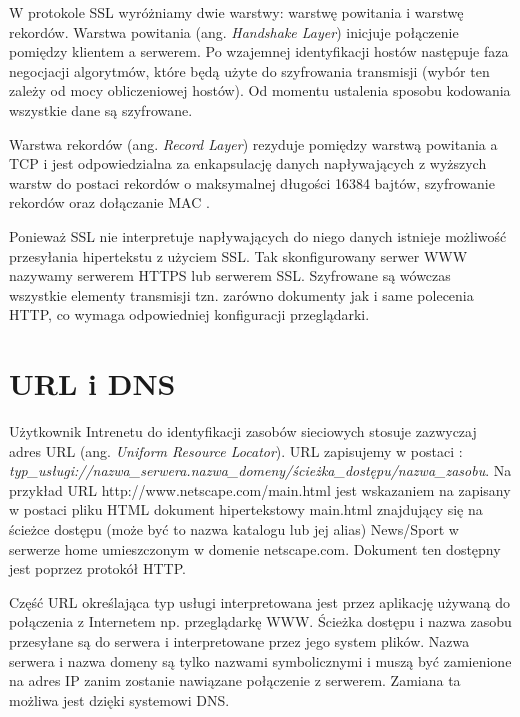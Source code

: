 W protokole SSL wyróżniamy dwie warstwy: warstwę powitania i warstwę rekordów. Warstwa powitania (ang. \emph{Handshake Layer}) 
inicjuje połączenie 
pomiędzy klientem a serwerem. Po wzajemnej identyfikacji hostów następuje faza negocjacji algorytmów, które będą 
użyte do szyfrowania transmisji (wybór ten zależy od mocy obliczeniowej hostów). Od momentu ustalenia sposobu 
kodowania wszystkie dane są szyfrowane.

Warstwa rekordów (ang. \emph{Record Layer}) rezyduje pomiędzy warstwą powitania a TCP i jest odpowiedzialna za 
enkapsulację danych napływających z wyższych warstw do postaci rekordów o maksymalnej długości 16384 bajtów, 
szyfrowanie rekordów oraz dołączanie MAC \cite{barylo10}.

Ponieważ SSL nie interpretuje napływających do niego danych istnieje możliwość przesyłania hipertekstu z 
użyciem SSL. Tak skonfigurowany serwer WWW nazywamy serwerem HTTPS lub serwerem SSL. Szyfrowane są wówczas 
wszystkie elementy  transmisji tzn. zarówno dokumenty jak i same polecenia HTTP, co wymaga odpowiedniej 
konfiguracji przeglądarki.

\section{URL i DNS}
	
Użytkownik Intrenetu do identyfikacji zasobów sieciowych stosuje zazwyczaj adres URL (ang. \emph{Uniform Resource 
Locator}). URL zapisujemy w postaci \cite{barylo5, barylo6}:\\
\emph{typ\_usługi://nazwa\_serwera.nazwa\_domeny/ścieżka\_dostępu/nazwa\_zasobu}. 
Na przykład URL http://www.netscape.com/main.html jest wskazaniem na zapisany w postaci pliku HTML 
dokument hipertekstowy main.html znajdujący się na ścieżce dostępu (może być to nazwa katalogu lub jej alias) 
News/Sport w serwerze home umieszczonym w domenie netscape.com. Dokument ten dostępny jest poprzez protokół 
HTTP.

Część URL określająca typ usługi interpretowana jest przez aplikację używaną do połączenia z Internetem 
np. przeglądarkę WWW. Ścieżka dostępu i nazwa zasobu przesyłane są do serwera i interpretowane przez jego system 
plików. Nazwa serwera i nazwa domeny są tylko nazwami symbolicznymi i muszą być zamienione na adres IP zanim 
zostanie nawiązane połączenie z serwerem. Zamiana ta możliwa jest dzięki systemowi DNS.

